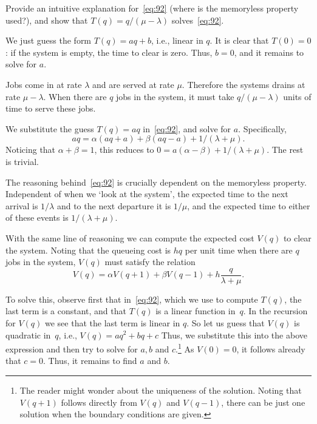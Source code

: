\documentclass[companion]{subfiles}
\begin{document}
\begin{exercise}
Provide an intuitive explanation for~\cref{eq:92} (where is the memoryless property used?), and show that $T(q)=q/(\mu-\lambda)$ solves~\cref{eq:92}.  
\begin{hint}
We just guess the form $T(q) = aq + b$, i.e., linear in $q$. It is clear that $T(0)=0$: if the system is empty, the time to clear is zero. Thus, $b=0$, and it remains to solve for $a$. 
\end{hint}

\begin{solution}
  Jobs come in at rate $\lambda$ and are served at rate $\mu$.
  Therefore the systems drains at rate $\mu-\lambda$.
  When there are $q$ jobs in the system, it must take $q/(\mu-\lambda)$ units of time to serve these jobs. 

  We substitute the guess $T(q) = aq$ in~\cref{eq:92}, and solve for $a$. Specifically,
  \begin{equation*}
    a q = \alpha (aq + a) + \beta (a q - a) + 1/(\lambda+\mu). 
  \end{equation*}
  Noticing that $\alpha + \beta = 1$, this reduces to $0 = a(\alpha - \beta) + 1/(\lambda + \mu)$. The rest is trivial.

  The reasoning behind~\cref{eq:92} is crucially dependent on the memoryless property.
  Independent of when we `look at the system', the expected time to the next arrival is $1/\lambda$ and to the next departure it is $1/\mu$, and the expected time to either of these events is $1/(\lambda+\mu)$.
\end{solution}
\end{exercise}


With the same line of reasoning we can compute the expected cost $V(q)$ to clear the system.
Noting that the queueing cost is $hq$ per unit time when there are $q$ jobs in the system, $V(q)$ must satisfy the relation
\begin{equation}\label{eq:93}
  V(q) = \alpha V(q+1) + \beta V(q-1) + h\frac{q}{\lambda + \mu}.
\end{equation}


To solve this, observe first that in~\cref{eq:92}, which we use to compute $T(q)$, the last term is a constant, and that $T(q)$ is a linear function in~$q$.
In the recursion for $V(q)$ we see that the last term is linear in $q$.
So let us guess that $V(q)$ is quadratic in~$q$, i.e., $V(q)=a q^2 + b q + c$ Thus, we substitute this into the above expression and then try to solve for $a,b$ and $c$.\footnote{The reader might wonder about the uniqueness of the solution.
  Noting that $V(q+1)$ follows directly from $V(q)$ and $V(q-1)$, there can be just one solution when the boundary conditions are given.}
As $V(0)=0$, it follows already that $c=0$.
Thus, it remains to find $a$ and $b$.
\end{document}

